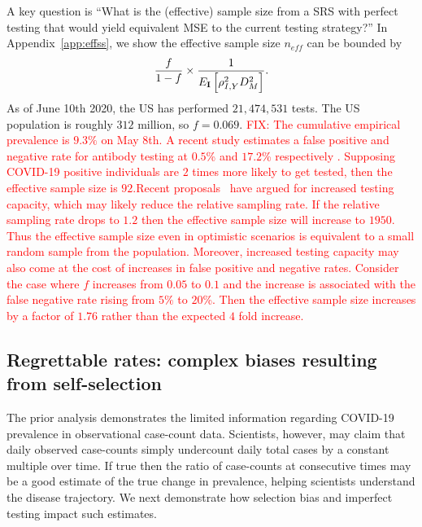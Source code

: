\documentclass[11pt]{amsart}
\numberwithin{equation}{section}
\theoremstyle{plain}
\def\I{\bf I}
\begin{document}
A key question is ``What is the (effective) sample size from a SRS with perfect testing that would yield equivalent MSE to the current testing strategy?'' In Appendix~\ref{app:effss}, we show the effective sample size $n_{eff}$ can be bounded by
$$
\frac{f}{1-f} \times \frac{1}{E_{\I} \left[ \rho_{I,Y}^2 D_M^2 \right]}.
$$
As of June 10th 2020, the US has performed $21,474,531$ tests.  The US population is roughly $312$ million, so $f = 0.069$.  \textcolor{red}{FIX: The cumulative empirical prevalence is $9.3\%$ on May 8th. A recent study estimates a false positive and negative rate for antibody testing at $0.5$\% and $17.2$\% respectively \citep{Bendavid2020}. Supposing COVID-19 positive individuals are $2$ times more likely to get tested, then the effective sample size is $92$.Recent proposals~\citep{Siddarth2020} have argued for increased testing capacity, which may likely reduce the relative sampling rate.  If the relative sampling rate drops to $1.2$ then the effective sample size will increase to $1950$.  Thus the effective sample size even in optimistic scenarios is equivalent to a small random sample from the population.  Moreover, increased testing capacity may also come at the cost of increases in false positive and negative rates.  Consider the case where $f$ increases from $0.05$ to $0.1$ and the increase is associated with the false negative rate rising from $5\%$ to $20$\%.  Then the effective sample size increases by a factor of $1.76$ rather than the expected $4$ fold increase.}


\subsection{Regrettable rates: complex biases resulting from self-selection}
\label{section:rates}

The prior analysis demonstrates the limited information regarding COVID-19 prevalence in observational case-count data.  Scientists, however, may claim that daily observed case-counts simply undercount daily total cases by a constant multiple over time.  If true then the ratio of case-counts at consecutive times may be a good estimate of the true change in prevalence, helping scientists understand the disease trajectory.  We next demonstrate how selection bias and imperfect testing impact such estimates.
\end{document}
